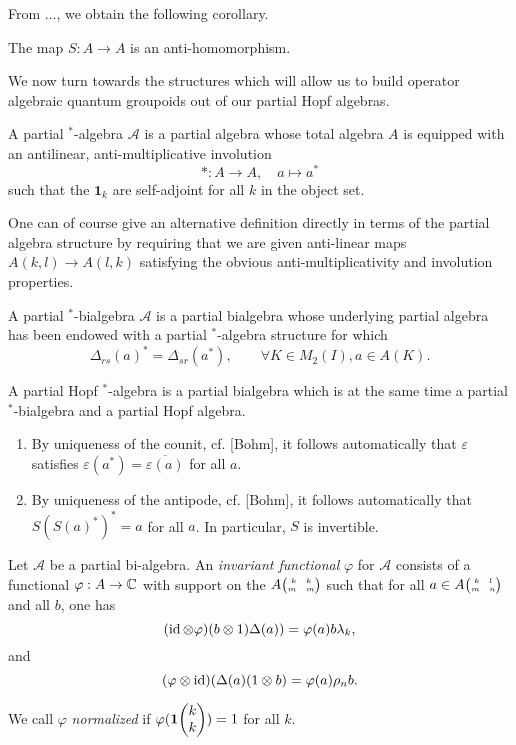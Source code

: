  From ..., we obtain the following corollary. 

\begin{Cor} The map $S:A\rightarrow A$ is an anti-homomorphism.
\end{Cor} 

We now turn towards the structures which will allow us to build operator algebraic quantum groupoids out of our partial Hopf algebras.

\begin{Def} A partial $^*$-algebra $\mathscr{A}$ is a partial algebra whose total algebra $A$ is equipped with an antilinear, anti-multiplicative involution \[*:A\rightarrow A,\quad a\mapsto a^*\] such that the $\mathbf{1}_k$ are self-adjoint for all $k$ in the object set. 
\end{Def} 

One can of course give an alternative definition directly in terms of the partial algebra structure by requiring that we are given anti-linear maps $A(k,l)\rightarrow A(l,k)$ satisfying the obvious anti-multiplicativity and involution properties.

\begin{Def} A partial $^*$-bialgebra $\mathscr{A}$ is a partial bialgebra whose underlying partial algebra has been endowed with a partial $^*$-algebra structure for which \[\Delta_{rs}(a)^* = \Delta_{sr}(a^*),\qquad \forall K\in M_2(I), a\in A(K).\]

A partial Hopf $^*$-algebra is a partial bialgebra which is at the same time a partial $^*$-bialgebra and a partial Hopf algebra.
\end{Def} 

\begin{Rem}
\begin{enumerate}
\item By uniqueness of the counit, cf. [Bohm], it follows automatically that $\varepsilon$ satisfies $\varepsilon(a^*) = \overline{\varepsilon(a)}$ for all $a$. %
\item By uniqueness of the antipode, cf. [Bohm], it follows automatically that $S(S(a)^*)^* = a$ for all $a$. In particular, $S$ is invertible. %
\end{enumerate}
\end{Rem}

\begin{Def} Let $\mathscr{A}$ be a partial bi-algebra. An \emph{invariant functional} $\varphi$ for $\mathscr{A}$ consists of a functional $\varphi:A\rightarrow \mathbb{C}$ with support on the $A{{\tiny \begin{pmatrix} k \quad k \\ m \quad m\end{pmatrix}}}$ such that for all $a\in A{{\tiny \begin{pmatrix} k \quad l \\ m \quad n\end{pmatrix}}}$ and all $b$, one has  \[(\operatorname{id}\otimes \varphi)(b\otimes 1)\Delta(a)) = \varphi(a)b\lambda_k,\] and \[(\varphi\otimes \operatorname{id})(\Delta(a)(1\otimes b) = \varphi(a)\rho_nb.\]

We call $\varphi$ \emph{normalized} if $\varphi(\mathbf{1}\!\begin{pmatrix} k \\ k\end{pmatrix}) = 1$ for all $k$. 
\end{Def} %

